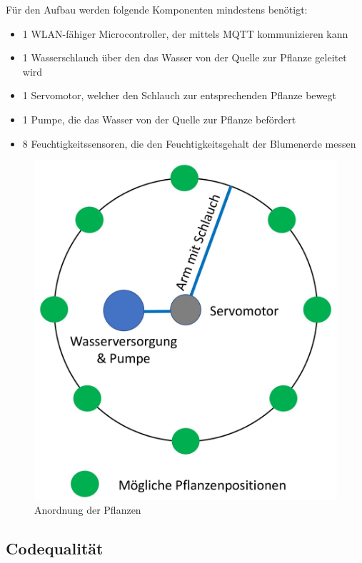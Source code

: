         Für den Aufbau werden folgende Komponenten mindestens benötigt:
        \begin{itemize}
            \item 1 WLAN-fähiger Microcontroller, der mittels MQTT kommunizieren kann
            \item 1 Wasserschlauch über den das Wasser von der Quelle zur Pflanze geleitet wird
            \item 1 Servomotor, welcher den Schlauch zur entsprechenden Pflanze bewegt
            \item 1 Pumpe, die das Wasser von der Quelle zur Pflanze befördert
           \item 8 Feuchtigkeitssensoren, die den Feuchtigkeitsgehalt der Blumenerde messen
        \end{itemize}
        \begin{figure}
            \centering
            \includegraphics[width=0.6\linewidth]{Pictures/Konzept/Position}
            \caption{Anordnung der Pflanzen}
            \label{fig:position}
        \end{figure}
        
    \subsection{Codequalität}